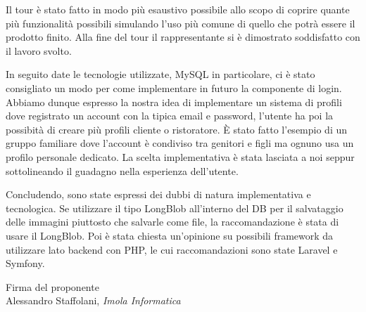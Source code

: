 \documentclass[a4paper, 11pt]{article}
\begin{document}
Il tour è stato fatto in modo più esaustivo possibile allo scopo di coprire quante più funzionalità possibili simulando l'uso più comune di quello che potrà essere il prodotto finito.
Alla fine del tour il rappresentante si è dimostrato soddisfatto con il lavoro svolto.

In seguito date le tecnologie utilizzate, MySQL in particolare, ci è stato consigliato un modo per come implementare in futuro la componente di login. Abbiamo dunque espresso la nostra idea di implementare un sistema di profili dove registrato un account con la tipica email e password, l'utente ha poi la possibità di creare più profili cliente o ristoratore. È stato fatto l'esempio di un gruppo familiare dove l'account è condiviso tra genitori e figli ma ognuno usa un profilo personale dedicato.
La scelta implementativa è stata lasciata a noi seppur sottolineando il guadagno nella esperienza dell'utente.

Concludendo, sono state espressi dei dubbi di natura implementativa e tecnologica.
Se utilizzare il tipo LongBlob all'interno del DB per il salvataggio delle immagini piuttosto che salvarle come file, la raccomandazione è stata di usare il LongBlob.
Poi è stata chiesta un'opinione su possibili framework da utilizzare lato backend con PHP, le cui raccomandazioni sono state Laravel e Symfony.

\vspace{100pt}
\begin{flushleft}
\hfill Firma del proponente \\
\vspace{50pt}
\hfill Alessandro Staffolani, \textit{Imola Informatica}
\end{flushleft}
\end{document}
